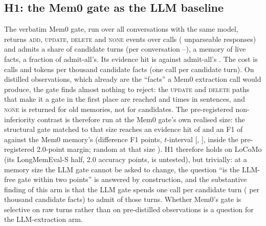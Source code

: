 \documentclass{ceurart}
\begin{document}
\subsection{H1: the Mem0 gate as the LLM baseline}
\label{sec:h1}
The verbatim Mem0 gate, run over all \memzNconv{} conversations with the same model, returns \memzAdd{} \textsc{add}, \memzUpdate{} \textsc{update}, \memzDelete{} \textsc{delete} and \memzNone{} \textsc{none} events over \memzCalls{} calls (\memzParseFail{} unparseable responses) and admits a share \memzAdmitRate{} of candidate turns (per conversation \memzAdmitRateMin--\memzAdmitRateMax), a memory of \memzLive{} live facts, a fraction \memzFracOfAdmitAll{} of admit-all's. Its evidence hit is \memzHit{} against admit-all's \hitLcAdmitAll. The cost is \memzCallsPerK{} calls and \memzTokensPerK{} tokens per thousand candidate facts (one call per candidate turn). On distilled observations, which already are the ``facts'' a Mem0 extraction call would produce, the gate finds almost nothing to reject: the \textsc{update} and \textsc{delete} paths that make it a gate in the first place are reached \memzUpdate{} and \memzDelete{} times in \nObsSentences{} sentences, and \textsc{none} is returned for old memories, not for candidates. The pre-registered non-inferiority contrast is therefore run at the Mem0 gate's own realised size: the structural gate matched to that size reaches an evidence hit of \hitStructAtMemz{} and an F1 of \foneStructAtMemz{} against the Mem0 memory's \foneMemz{} (difference \hOneDiffFone{} F1 points, $t$-interval [\hOneCiLo, \hOneCiHi], inside the pre-registered 2.0-point margin; random at that size \foneRandomAtMemz). H1 therefore holds on LoCoMo (its LongMemEval-S half, 2.0 accuracy points, is untested), but trivially: at a memory size the LLM gate cannot be asked to change, the question ``is the LLM-free gate within two points'' is answered by construction, and the substantive finding of this arm is that the LLM gate spends one call per candidate turn (\memzCallsPerK{} per thousand candidate facts) to admit \memzAdmitRate{} of those turns. Whether Mem0's gate is selective on raw turns rather than on pre-distilled observations is a question for the LLM-extraction arm.
\end{document}
